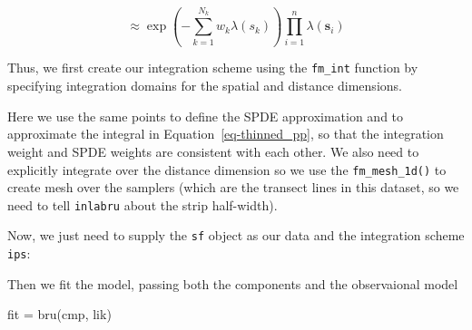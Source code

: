 \documentclass[
  letterpaper,
  DIV=11,
  numbers=noendperiod]{scrartcl}
\newenvironment{Shaded}{\begin{snugshade}}{\end{snugshade}}
\newcommand{\AttributeTok}[1]{\textcolor[rgb]{0.40,0.45,0.13}{#1}}
\newcommand{\CommentTok}[1]{\textcolor[rgb]{0.37,0.37,0.37}{#1}}
\newcommand{\DecValTok}[1]{\textcolor[rgb]{0.68,0.00,0.00}{#1}}
\newcommand{\FunctionTok}[1]{\textcolor[rgb]{0.28,0.35,0.67}{#1}}
\newcommand{\NormalTok}[1]{\textcolor[rgb]{0.00,0.23,0.31}{#1}}
\newcommand{\OtherTok}[1]{\textcolor[rgb]{0.00,0.23,0.31}{#1}}
\newcommand{\SpecialCharTok}[1]{\textcolor[rgb]{0.37,0.37,0.37}{#1}}
\newcommand{\StringTok}[1]{\textcolor[rgb]{0.13,0.47,0.30}{#1}}
\begin{document}
\[
\approx\exp\left(-\sum_{k=1}^{N_k}w_k\lambda(s_k)\right)\prod_{i=1}^n \lambda(\mathbf{s}_i)
\]

Thus, we first create our integration scheme using the \texttt{fm\_int}
function by specifying integration domains for the spatial and distance
dimensions.

Here we use the same points to define the SPDE approximation and to
approximate the integral in Equation~\ref{eq-thinned_pp}, so that the
integration weight and SPDE weights are consistent with each other. We
also need to explicitly integrate over the distance dimension so we use
the \texttt{fm\_mesh\_1d()} to create mesh over the samplers (which are
the transect lines in this dataset, so we need to tell \texttt{inlabru}
about the strip half-width).

\begin{Shaded}
\end{Shaded}

Now, we just need to supply the \texttt{sf} object as our data and the
integration scheme \texttt{ips}:

\begin{Shaded}
\end{Shaded}

Then we fit the model, passing both the components and the observaional
model

\begin{Shaded}
\begin{Highlighting}[]
\NormalTok{fit }\OtherTok{=} \FunctionTok{bru}\NormalTok{(cmp, lik)}
\end{Highlighting}
\end{Shaded}
\end{document}
